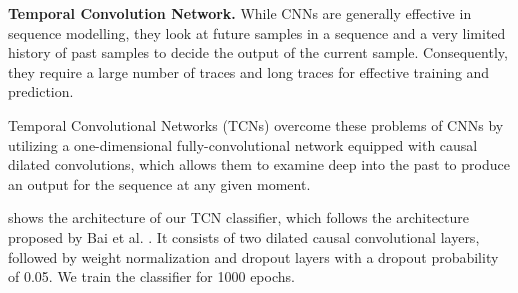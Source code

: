 {\small
\textbf{Temporal Convolution Network.}
%
While CNNs are generally effective in sequence modelling, they look at future
samples in a sequence and a very limited history of past samples to decide the
output of the current sample. Consequently, they require a large number of traces
and long traces for effective training and prediction.

Temporal Convolutional Networks (TCNs) \cite{bai2018tcn} overcome these problems
of CNNs by utilizing a one-dimensional fully-convolutional network equipped with
causal dilated convolutions, which allows them to examine deep into the past to
produce an output for the sequence at any given moment.

 shows the architecture of our TCN classifier, which follows the
architecture proposed by Bai et al. \cite{bai2018tcn}. It
consists of two dilated causal convolutional layers, followed by weight
normalization and dropout layers with a dropout probability of 0.05. We train
the classifier for 1000 epochs.
}


